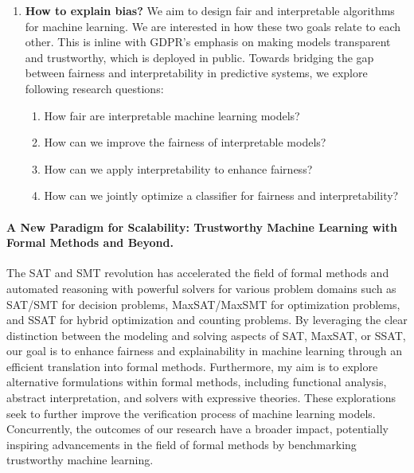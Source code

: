 \begin{itemize}
\begin{enumerate}
		\item \textbf{How to explain bias?} We aim to design fair and interpretable algorithms for  machine learning. We are interested in how these two goals relate to each other. This is inline with GDPR's emphasis on making models transparent and trustworthy, which is deployed in public.	Towards bridging the gap between fairness and interpretability in predictive systems, we explore following research questions:
		
		\begin{enumerate}
			\item How fair are interpretable machine learning models? 
			\item How can we improve the fairness of interpretable models?
			\item How can we apply interpretability to enhance fairness?
			\item How can we jointly optimize a classifier for  fairness and interpretability?
		\end{enumerate}
	
	
	\end{enumerate}
\end{itemize}



	\paragraph{A New Paradigm for Scalability: Trustworthy Machine Learning with Formal Methods and Beyond.} The SAT and SMT revolution has accelerated the field of formal methods and automated reasoning with powerful solvers  for various problem domains such as SAT/SMT for decision problems, MaxSAT/MaxSMT for optimization problems, and SSAT for hybrid optimization and counting problems. By leveraging the clear distinction between the modeling and solving aspects of SAT, MaxSAT, or SSAT, our goal is to enhance fairness and explainability in machine learning through an efficient translation into formal methods. Furthermore, my aim is to explore alternative formulations within formal methods, including functional analysis, abstract interpretation, and solvers with expressive theories. These explorations seek to further improve the verification process of machine learning models. Concurrently, the outcomes of our research have a broader impact, potentially inspiring advancements in the field of formal methods by benchmarking trustworthy machine learning.


